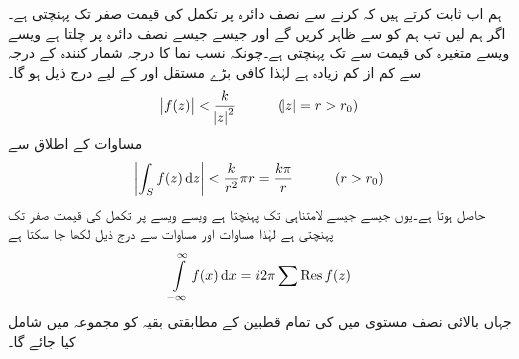 ہم اب ثابت کرتے ہیں کہ  کرنے سے نصف دائرہ  پر تکمل کی قیمت صفر تک پہنچتی ہے۔اگر ہم  لیں تب ہم  کو  سے ظاہر کریں گے اور جیسے جیسے  نصف دائرہ  پر چلتا ہے ویسے ویسے  متغیرہ  کی قیمت  سے  تک پہنچتی ہے۔چونکہ نسب نما کا درجہ شمار کنندہ کے درجہ سے کم از کم  زیادہ ہے لہٰذا کافی بڑے مستقل  اور  کے لیے درج ذیل ہو گا۔
\begin{align*}
\abs{f(z)}<\frac{k}{\abs{z}^2}\quad \quad \quad (\abs{z}=r>r_0)
\end{align*}
مساوات  کے اطلاق سے 
\begin{align*}
\abs{\int_S f(z)\dif z}<\frac{k}{r^2}\pi r=\frac{k\pi}{r}\quad \quad \quad (r>r_0)
\end{align*}
حاصل ہوتا ہے۔یوں  جیسے جیسے  لامتناہی تک پہنچتا ہے ویسے ویسے  پر تکمل کی قیمت  صفر تک پہنچتی ہے  لہٰذا مساوات  اور  مساوات  سے درج ذیل لکھا جا سکتا ہے
\begin{align}\label{مساوات_بقیہ_غیر-مناسب_تکمل}
\int\limits_{-\infty}^{\infty} f(x)\dif x=i2\pi\sum\Res f(z)
\end{align}
جہاں بالائی نصف مستوی میں  کی تمام قطبین کے مطابقتی بقیہ کو مجموعہ میں شامل کیا جائے گا۔

